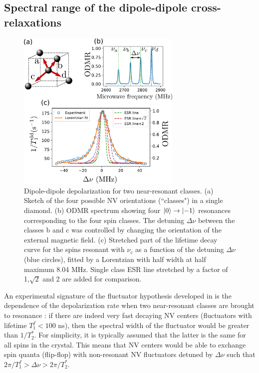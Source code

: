 \documentclass[preprintnumbers,amsmath,amssymb,onecolumn,12pt]{revtex4-2}\usepackage{graphicx}%
\begin{document}
\subsection{Spectral range of the dipole-dipole cross-relaxations}
\label{fluctuator width}
\begin{figure}[h]
\includegraphics[width=0.7\textwidth]{Figures_SI/largeur_fluct_SI}
\caption{Dipole-dipole depolarization for two near-resonant classes. (a) Sketch of the four possible NV orientations (``classes") in a single diamond. (b) ODMR spectrum showing four $\ket{0} \to \ket{-1}$ resonances corresponding to the four spin classes. The detuning $\Delta \nu$ between the classes b and c was controlled by changing the orientation of the external magnetic field. (c) Stretched part of the lifetime decay curve for the spins resonant with $\nu_c$ as a function of the detuning $\Delta \nu$ (blue circles), fitted by a Lorentzian with half width at half maximum 8.04 MHz. Single class ESR line stretched by a factor of 1,$\sqrt{2}$ and 2 are added for comparison.}
\label{largeur_fluct}
\end{figure}

An experimental signature of the fluctuator hypothesis developed in \cite{choi_depolarization_2017} is the dependence of the depolarization rate when two near-resonant classes are brought to resonance : if there are indeed very fast decaying NV centers (fluctuators with lifetime $T_1^f < 100$ ns), then the spectral width of the fluctuator would be greater than $1/T_2^*$.  For simplicity, it is typically assumed that the latter is the same for all spins in the crystal. This means that NV centers would be able to exchange spin quanta (flip-flop) with non-resonant NV fluctuators detuned by $\Delta \nu$ such that $2\pi/T_1^f > \Delta \nu > 2\pi/T_2^*$.
\end{document}
